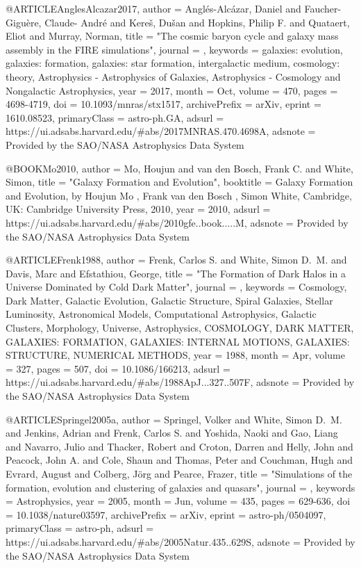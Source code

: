 @ARTICLE{AnglesAlcazar2017,
       author = {{Angl{\'e}s-Alc{\'a}zar}, Daniel and {Faucher-Gigu{\`e}re}, Claude-
        Andr{\'e} and {Kere{\v{s}}}, Du{\v{s}}an and {Hopkins}, Philip
        F. and {Quataert}, Eliot and {Murray}, Norman},
        title = "{The cosmic baryon cycle and galaxy mass assembly in the FIRE simulations}",
      journal = {\mnras},
     keywords = {galaxies: evolution, galaxies: formation, galaxies: star formation, intergalactic medium, cosmology: theory, Astrophysics - Astrophysics of Galaxies, Astrophysics - Cosmology and Nongalactic Astrophysics},
         year = 2017,
        month = Oct,
       volume = {470},
        pages = {4698-4719},
          doi = {10.1093/mnras/stx1517},
archivePrefix = {arXiv},
       eprint = {1610.08523},
 primaryClass = {astro-ph.GA},
       adsurl = {https://ui.adsabs.harvard.edu/\#abs/2017MNRAS.470.4698A},
      adsnote = {Provided by the SAO/NASA Astrophysics Data System}
}

@BOOK{Mo2010,
       author = {{Mo}, Houjun and {van den Bosch}, Frank C. and {White}, Simon},
        title = "{Galaxy Formation and Evolution}",
    booktitle = {Galaxy Formation and Evolution, by Houjun Mo , Frank van den Bosch , Simon White, Cambridge, UK: Cambridge University Press, 2010},
         year = 2010,
       adsurl = {https://ui.adsabs.harvard.edu/\#abs/2010gfe..book.....M},
      adsnote = {Provided by the SAO/NASA Astrophysics Data System}
}

@ARTICLE{Frenk1988,
       author = {{Frenk}, Carlos S. and {White}, Simon D.~M. and {Davis}, Marc and
        {Efstathiou}, George},
        title = "{The Formation of Dark Halos in a Universe Dominated by Cold Dark Matter}",
      journal = {\apj},
     keywords = {Cosmology, Dark Matter, Galactic Evolution, Galactic Structure, Spiral Galaxies, Stellar Luminosity, Astronomical Models, Computational Astrophysics, Galactic Clusters, Morphology, Universe, Astrophysics, COSMOLOGY, DARK MATTER, GALAXIES: FORMATION, GALAXIES: INTERNAL MOTIONS, GALAXIES: STRUCTURE, NUMERICAL METHODS},
         year = 1988,
        month = Apr,
       volume = {327},
        pages = {507},
          doi = {10.1086/166213},
       adsurl = {https://ui.adsabs.harvard.edu/\#abs/1988ApJ...327..507F},
      adsnote = {Provided by the SAO/NASA Astrophysics Data System}
}

@ARTICLE{Springel2005a,
       author = {{Springel}, Volker and {White}, Simon D.~M. and {Jenkins}, Adrian and
        {Frenk}, Carlos S. and {Yoshida}, Naoki and {Gao}, Liang and
        {Navarro}, Julio and {Thacker}, Robert and {Croton}, Darren and
        {Helly}, John and {Peacock}, John A. and {Cole}, Shaun and
        {Thomas}, Peter and {Couchman}, Hugh and {Evrard}, August and
        {Colberg}, J{\"o}rg and {Pearce}, Frazer},
        title = "{Simulations of the formation, evolution and clustering of galaxies and quasars}",
      journal = {\nat},
     keywords = {Astrophysics},
         year = 2005,
        month = Jun,
       volume = {435},
        pages = {629-636},
          doi = {10.1038/nature03597},
archivePrefix = {arXiv},
       eprint = {astro-ph/0504097},
 primaryClass = {astro-ph},
       adsurl = {https://ui.adsabs.harvard.edu/\#abs/2005Natur.435..629S},
      adsnote = {Provided by the SAO/NASA Astrophysics Data System}
}

